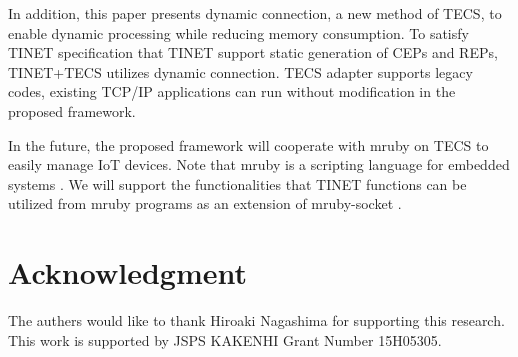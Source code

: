 \documentclass[conference]{IEEEtran/IEEEtran}
\begin{document}
In addition, this paper presents dynamic connection, a new method of TECS, to enable dynamic processing while reducing memory consumption.
To satisfy TINET specification that TINET support static generation of CEPs and REPs, TINET+TECS utilizes dynamic connection.
TECS adapter supports legacy codes, existing TCP/IP applications can run without modification in the proposed framework.

In the future, the proposed framework will cooperate with mruby on TECS \cite{par:mrubyonTECS} to easily manage IoT devices.
Note that mruby is a scripting language for embedded systems \cite{par:mruby}.
We will support the functionalities that TINET functions can be utilized from mruby programs as an extension of mruby-socket \cite{url:mruby-library}.

    


\section*{Acknowledgment}

The authers would like to thank Hiroaki Nagashima for supporting this research.
This work is supported by JSPS KAKENHI Grant Number 15H05305.





\end{document}
